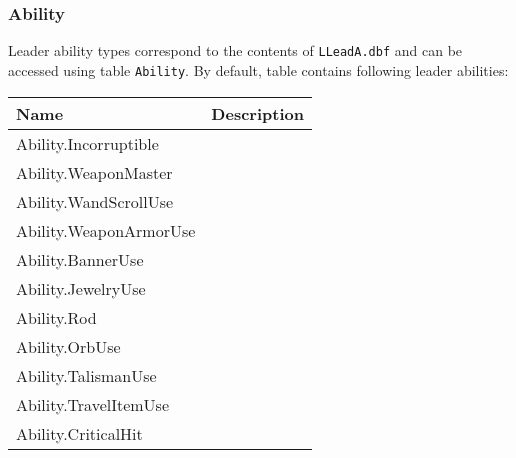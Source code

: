 \subsubsection{Ability}
\label{AbilityCategory}
Leader ability types correspond to the contents of \texttt{LLeadA.dbf} and can be accessed using table \texttt{Ability}.
By default, table contains following leader abilities:\\
\begin{tabularx}{\linewidth}{| l | X |}
\hline
\textbf{Name} & \textbf{Description} \\
\hline
Ability.Incorruptible &\\
\hline
Ability.WeaponMaster &\\
\hline
Ability.WandScrollUse &\\
\hline
Ability.WeaponArmorUse &\\
\hline
Ability.BannerUse &\\
\hline
Ability.JewelryUse &\\
\hline
Ability.Rod &\\
\hline
Ability.OrbUse &\\
\hline
Ability.TalismanUse &\\
\hline
Ability.TravelItemUse &\\
\hline
Ability.CriticalHit &\\
\hline
\end{tabularx}

